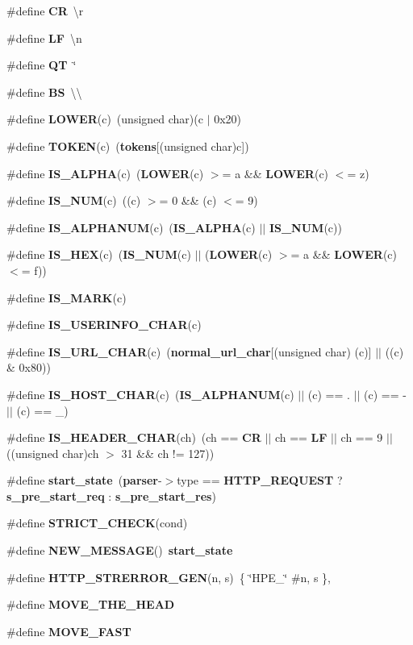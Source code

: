 \begin{DoxyCompactItemize}
\#define {\bf CR}~\textquotesingle{}\textbackslash{}r\textquotesingle{}
\item 
\#define {\bf LF}~\textquotesingle{}\textbackslash{}n\textquotesingle{}
\item 
\#define {\bf QT}~\textquotesingle{}\char`\"{}\textquotesingle{}
\item 
\#define {\bf BS}~\textquotesingle{}\textbackslash{}\textbackslash{}\textquotesingle{}
\item 
\#define {\bf L\+O\+W\+ER}(c)~(unsigned char)(c $\vert$ 0x20)
\item 
\#define {\bf T\+O\+K\+EN}(c)~({\bf tokens}[(unsigned char)c])
\item 
\#define {\bf I\+S\+\_\+\+A\+L\+P\+HA}(c)~({\bf L\+O\+W\+ER}(c) $>$= \textquotesingle{}a\textquotesingle{} \&\& {\bf L\+O\+W\+ER}(c) $<$= \textquotesingle{}z\textquotesingle{})
\item 
\#define {\bf I\+S\+\_\+\+N\+UM}(c)~((c) $>$= \textquotesingle{}0\textquotesingle{} \&\& (c) $<$= \textquotesingle{}9\textquotesingle{})
\item 
\#define {\bf I\+S\+\_\+\+A\+L\+P\+H\+A\+N\+UM}(c)~({\bf I\+S\+\_\+\+A\+L\+P\+HA}(c) $\vert$$\vert$ {\bf I\+S\+\_\+\+N\+UM}(c))
\item 
\#define {\bf I\+S\+\_\+\+H\+EX}(c)~({\bf I\+S\+\_\+\+N\+UM}(c) $\vert$$\vert$ ({\bf L\+O\+W\+ER}(c) $>$= \textquotesingle{}a\textquotesingle{} \&\& {\bf L\+O\+W\+ER}(c) $<$= \textquotesingle{}f\textquotesingle{}))
\item 
\#define {\bf I\+S\+\_\+\+M\+A\+RK}(c)
\item 
\#define {\bf I\+S\+\_\+\+U\+S\+E\+R\+I\+N\+F\+O\+\_\+\+C\+H\+AR}(c)
\item 
\#define {\bf I\+S\+\_\+\+U\+R\+L\+\_\+\+C\+H\+AR}(c)~({\bf normal\+\_\+url\+\_\+char}[(unsigned char) (c)] $\vert$$\vert$ ((c) \& 0x80))
\item 
\#define {\bf I\+S\+\_\+\+H\+O\+S\+T\+\_\+\+C\+H\+AR}(c)~({\bf I\+S\+\_\+\+A\+L\+P\+H\+A\+N\+UM}(c) $\vert$$\vert$ (c) == \textquotesingle{}.\textquotesingle{} $\vert$$\vert$ (c) == \textquotesingle{}-\/\textquotesingle{} $\vert$$\vert$ (c) == \textquotesingle{}\+\_\+\textquotesingle{})
\item 
\#define {\bf I\+S\+\_\+\+H\+E\+A\+D\+E\+R\+\_\+\+C\+H\+AR}(ch)~(ch == {\bf CR} $\vert$$\vert$ ch == {\bf LF} $\vert$$\vert$ ch == 9 $\vert$$\vert$ ((unsigned char)ch $>$ 31 \&\& ch != 127))
\item 
\#define {\bf start\+\_\+state}~({\bf parser}-\/$>$type == {\bf H\+T\+T\+P\+\_\+\+R\+E\+Q\+U\+E\+ST} ? {\bf s\+\_\+pre\+\_\+start\+\_\+req} \+: {\bf s\+\_\+pre\+\_\+start\+\_\+res})
\item 
\#define {\bf S\+T\+R\+I\+C\+T\+\_\+\+C\+H\+E\+CK}(cond)
\item 
\#define {\bf N\+E\+W\+\_\+\+M\+E\+S\+S\+A\+GE}()~{\bf start\+\_\+state}
\item 
\#define {\bf H\+T\+T\+P\+\_\+\+S\+T\+R\+E\+R\+R\+O\+R\+\_\+\+G\+EN}(n,  s)~\{ \char`\"{}H\+P\+E\+\_\+\char`\"{} \#n, s \},
\item 
\#define {\bf M\+O\+V\+E\+\_\+\+T\+H\+E\+\_\+\+H\+E\+AD}
\item 
\#define {\bf M\+O\+V\+E\+\_\+\+F\+A\+ST}
\end{DoxyCompactItemize}
